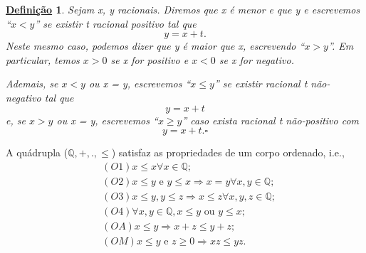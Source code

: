 \documentclass{article}
\newtheorem*{def*}{\underline{Defini\c c\~ao}}
\begin{document}
\begin{def*}
  Sejam x, y racionais. Diremos que x \'e menor e que y e escrevemos ``$x < y$'' se existir t racional positivo tal que 
  $$
    y = x + t.
  $$
  Neste mesmo caso, podemos dizer que y \'e maior que x, escrevendo ``$x > y$''. Em particular, temos $x > 0$ se x for positivo e 
$x < 0$ se x for negativo. 

  Ademais, se $x < y$ ou x = y, escrevemos ``$x \leq{y}$'' se existir racional t n\~ao-negativo tal que 
  $$
    y = x + t
  $$
  e, se $x > y$ ou x = y, escrevemos ``$x \geq{y}$'' caso exista racional t n\~ao-positivo com
  $$
    y = x + t. \square
  $$
\end{def*}
  A qu\'adrupla ($\mathbb{Q}, +, ., \leq{}$) satisfaz as propriedades de um corpo ordenado, i.e., 
 \begin{align*}
   &(O1) x \leq{x}\forall x\in \mathbb{Q};\\
   &(O2) x\leq{y} \text{ e } y \leq{x}\Rightarrow x = y \forall x, y\in \mathbb{Q};\\
   &(O3) x \leq{y}, y \leq{z}\Rightarrow x \leq{z}\forall x, y, z\in \mathbb{Q};\\
   &(O4)\forall x, y \in \mathbb{Q}, x \leq{y} \text{ ou } y \leq{x};\\
   &(OA) x \leq{y}\Rightarrow x + z \leq{y + z};\\
   &(OM) x \leq{y} \text{ e } z \geq{0}\Rightarrow xz \leq{yz}. 
 \end{align*}
\end{document}
